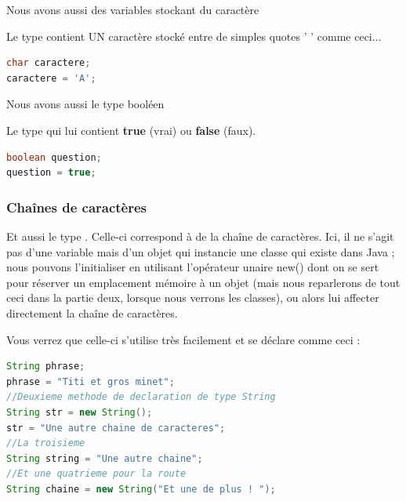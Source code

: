 \documentclass[a4paper,twoside]{article}
\begin{document}
Nous avons aussi des variables stockant du caractère

Le type  contient UN caractère stocké entre de simples quotes ' ' comme ceci...
\begin{lstlisting}[language=java]
char caractere;
caractere = 'A';
\end{lstlisting}

\bigskip

Nous avons aussi le type booléen

Le type  qui lui contient \textbf{true} (vrai) ou \textbf{false} (faux).
\begin{lstlisting}[language=java]
boolean question;
question = true;
\end{lstlisting}

\subsubsection{Chaînes de caractères}
Et aussi le type . Celle-ci correspond à de la chaîne de caractères.
Ici, il ne s'agit pas d'une variable mais d'un objet qui instancie une classe qui existe dans Java ; nous pouvons l'initialiser en utilisant l'opérateur unaire new() dont on se sert pour réserver un emplacement mémoire à un objet (mais nous reparlerons de tout ceci dans la partie deux, lorsque nous verrons les classes), ou alors lui affecter directement la chaîne de caractères.

Vous verrez que celle-ci s'utilise très facilement et se déclare comme ceci :
\begin{lstlisting}[language=java]
String phrase;
phrase = "Titi et gros minet";
//Deuxieme methode de declaration de type String
String str = new String();
str = "Une autre chaine de caracteres";
//La troisieme
String string = "Une autre chaine";
//Et une quatrieme pour la route
String chaine = new String("Et une de plus ! ");
\end{lstlisting}

\bigskip
\end{document}
